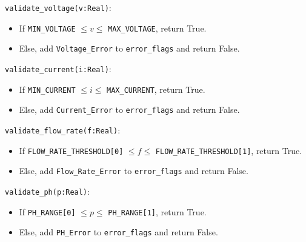\documentclass[12pt, titlepage]{article}
\begin{document}
\begin{description}
  \item[Access Routine Semantics:]
  \item
  \texttt{validate\_voltage(v:Real)}:
  \item
  \begin{itemize}
    \item If \texttt{MIN\_VOLTAGE} $\leq v \leq$ \texttt{MAX\_VOLTAGE}, return True.
  \end{itemize}
  \item
  \begin{itemize}
    \item Else, add \texttt{Voltage\_Error} to \texttt{error\_flags} and return False.
  \end{itemize}
  \item 

  \texttt{validate\_current(i:Real)}:
  \item
  \begin{itemize}
    \item If \texttt{MIN\_CURRENT} $\leq i \leq$ \texttt{MAX\_CURRENT}, return True.
  \end{itemize}
  \item
  \begin{itemize}
    \item Else, add \texttt{Current\_Error} to \texttt{error\_flags} and return False.
  \end{itemize}
  \item 

  \texttt{validate\_flow\_rate(f:Real)}:
  \item
  \begin{itemize}
    \item If \texttt{FLOW\_RATE\_THRESHOLD[0]} $\leq f \leq$ \texttt{FLOW\_RATE\_THRESHOLD[1]}, return True.
  \end{itemize}
  \item
  \begin{itemize}
    \item Else, add \texttt{Flow\_Rate\_Error} to \texttt{error\_flags} and return False.
  \end{itemize}
  \item 

  \texttt{validate\_ph(p:Real)}:
  \item
  \begin{itemize}
    \item If \texttt{PH\_RANGE[0]} $\leq p \leq$ \texttt{PH\_RANGE[1]}, return True.
  \end{itemize}
  \item
  \begin{itemize}
    \item Else, add \texttt{PH\_Error} to \texttt{error\_flags} and return False.
  \end{itemize}
  \item 


\end{description}
\end{document}
